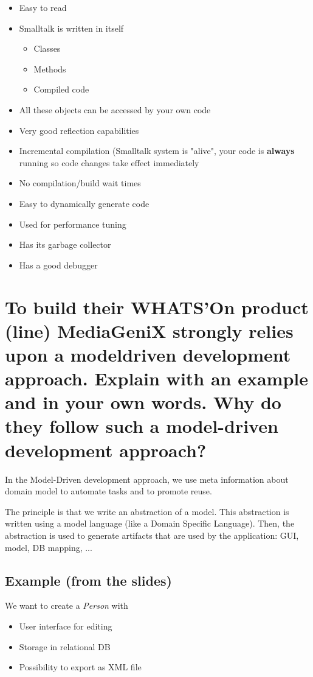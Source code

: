 \begin{itemize}
\item Easy to read
\item Smalltalk is written in itself
\begin{itemize}
\item Classes
\item Methods
\item Compiled code
\end{itemize}
\item All these objects can be accessed by your own code
\item Very good reflection capabilities
\item Incremental compilation (Smalltalk system is "alive", your code is \textbf{always} running so code changes take effect immediately
\item No compilation/build wait times
\item Easy to dynamically generate code
\item Used for performance tuning
\item Has its garbage collector
\item Has a good debugger
\end{itemize}


\section{To build their WHATS’On product (line) MediaGeniX strongly relies upon a modeldriven
development approach.
Explain with an example and in your own words.
Why do they follow such a model-driven development approach?}

In the Model-Driven development approach, we use meta information about domain model to automate tasks and to promote reuse.

The principle is that we write an abstraction of a model. 
This abstraction is written using a model language (like a Domain Specific Language).
Then, the abstraction is used to generate artifacts that are used by the application: GUI, model, DB mapping, ...

\subsection{Example (from the slides)}
We want to create a \textit{Person} with
\begin{itemize}
\item User interface for editing
\item Storage in relational DB
\item Possibility to export as XML file
\end{itemize}


